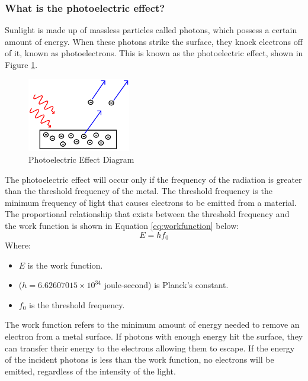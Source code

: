 \subsubsection{What is the photoelectric effect?}
Sunlight is made up of massless particles called photons, which possess a certain amount of energy. When these photons strike the surface, they knock electrons off of it, known as photoelectrons. This is known as the photoelectric effect, shown in Figure \ref{fig:photoelectric_effect_diagram}.\vspace{0.5em}

\begin{figure}[ht]
    \centering
    \includegraphics[width=0.4\textwidth]{Figures/photoelectric_effect_diagram.png}
    \caption{Photoelectric Effect Diagram \cite{KhanAcademy2025PhotoelectricEffect}}
    \label{fig:photoelectric_effect_diagram}
\end{figure}
\FloatBarrier

\noindent The photoelectric effect will occur only if the frequency of the radiation is greater than the threshold frequency of the metal. The threshold frequency is the minimum frequency of light that causes electrons to be emitted from a material. The proportional relationship that exists between the threshold frequency and the work function is shown in Equation \ref{eq:workfunction} below:
\begin{equation}
    E = hf_0
    \label{eq:workfunction}
\end{equation}
Where:
\begin{itemize}
    \item $E$ is the work function.
    \item ($h = 6.62607015 \times 10^{34}$ joule-second) is Planck's constant.
    \item $f_0$ is the threshold frequency. 
\end{itemize}\vspace{0.5em}
\noindent The work function refers to the minimum amount of energy needed to remove an electron from a metal surface. If photons with enough energy hit the surface, they can transfer their energy to the electrons allowing them to escape. If the energy of the incident photons is less than the work function, no electrons will be emitted, regardless of the intensity of the light. \cite{ScienceABC2025PhotoelectricBeginners}\vspace{0.5em}

